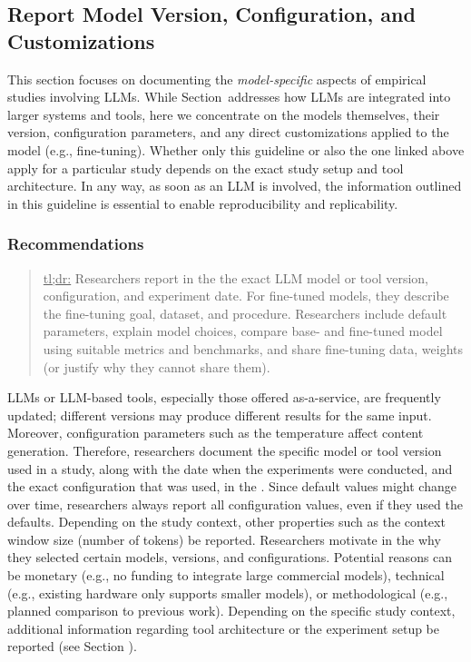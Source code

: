 



\subsection{Report Model Version, Configuration, and Customizations}

This section focuses on documenting the \emph{model-specific} aspects of empirical studies involving LLMs.
While Section~\toolarchitecture addresses how LLMs are integrated into larger systems and tools, here we concentrate on the models themselves, their version, configuration parameters, and any direct customizations applied to the model (e.g., fine-tuning).
Whether only this guideline or also the one linked above apply for a particular study depends on the exact study setup and tool architecture.
In any way, as soon as an LLM is involved, the information outlined in this guideline is essential to enable reproducibility and replicability.

\subsubsection{Recommendations}

\begin{quote}
\underline{tl;dr:} Researchers \must report in the \paper the exact LLM model or tool version, configuration, and experiment date. For fine-tuned models, they \must describe the fine-tuning goal, dataset, and procedure. Researchers \should include default parameters, explain model choices, compare base- and fine-tuned model using suitable metrics and benchmarks, and share fine-tuning data, weights (or justify why they cannot share them).
\end{quote}

LLMs or LLM-based tools, especially those offered as-a-service, are frequently updated; different versions may produce different results for the same input.
Moreover, configuration parameters such as the temperature affect content generation.
Therefore, researchers \must document the specific model or tool version used in a study, along with the date when the experiments were conducted, and the exact configuration that was used, in the \paper.
Since default values might change over time, researchers \should always report all configuration values, even if they used the defaults.
Depending on the study context, other properties such as the context window size (number of tokens) \may be reported.
Researchers \should motivate in the \paper why they selected certain models, versions, and configurations.
Potential reasons can be monetary (e.g., no funding to integrate large commercial models), technical (e.g., existing hardware only supports smaller models), or methodological (e.g., planned comparison to previous work).
Depending on the specific study context, additional information regarding tool architecture or the experiment setup \should be reported (see Section \toolarchitecture).

